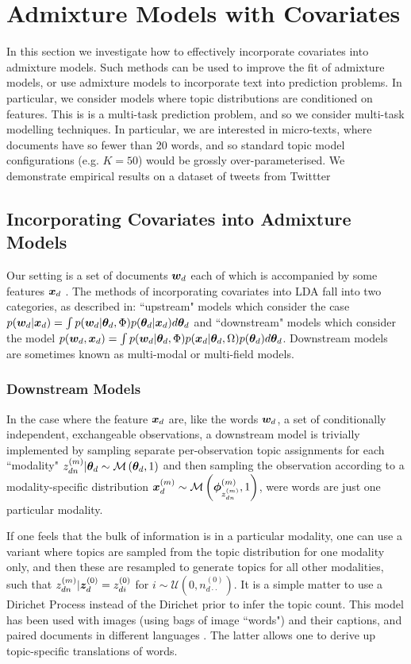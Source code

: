 
\section{Admixture Models with Covariates}
In this section we investigate how to effectively incorporate covariates into admixture models. Such methods can be used to improve the fit of admixture models, or use admixture models to incorporate text into prediction problems. In particular, we consider models where topic distributions are conditioned on features. This is is a multi-task prediction problem, and so we consider multi-task modelling techniques. In particular, we are interested in micro-texts, where documents have so fewer than 20 words, and so standard topic model configurations (e.g. $K=50$) would be grossly over-parameterised. We demonstrate empirical results on a dataset of tweets from Twittter

\subsection{Incorporating Covariates into Admixture Models}
Our setting is a set of documents $\bm w_d$ each of which is accompanied by some features $\bm x_d$ . The methods of incorporating covariates into LDA fall into two categories, as described in\cite{Mimno2008}: ``upstream" models which consider the case $p({ \bm w_d } | { \bm x_d }) = \int p({ \bm w_d }|{ \bm \theta_d }, \Phi)p({ \bm \theta_d }|{ \bm x_d }) d{ \bm \theta_d }$ 
and ``downstream" models which consider the model $p({ \bm w_d }, { \bm x_d }) = \int p({ \bm w_d }|{ \bm \theta_d }, \Phi)p({ \bm x_d }|{ \bm \theta_d }, \Omega)p({ \bm \theta_d })d{ \bm \theta_d }$. Downstream models are sometimes known as multi-modal\cite{Virtanen2012a} or multi-field\cite{Salomatin2009} models.

\subsubsection{Downstream Models}
In the case where the feature ${ \bm x_d }$ are, like the words ${ \bm w_d }$, a set of conditionally independent, exchangeable observations, a downstream model is trivially implemented\cite{Erosheva2004}\cite{Blei2003} by sampling separate per-observation topic assignments for each ``modality" $z_{dn}^{(m)}|{ \bm \theta_d } \sim \mathcal{M} \left( {{ \bm \theta_d }},{1} \right)$ and then sampling the observation according to a modality-specific distribution $\bm x_d^{(m)} \sim \mathcal{M} \left( {\bm \phi^{(m)}_{z^{(m)}_{dn}}},{1} \right)$, were words are just one particular modality.

If one feels that the bulk of information is in a particular modality, one can use a variant\cite{Blei2003} where topics are sampled from the topic distribution for one modality only, and then these are resampled to generate topics for all other modalities, such that $z_{dn}^{(m)}|\bm z_d^{(0)} = z_{di}^{(0)}$ for $i \sim \mathcal{U}(0, n_{d\cdot\cdot}^{(0)})$. It is a simple matter to use a Dirichet Process instead of the Dirichet prior to infer the topic count\cite{Yakhnenko2009}. This model has been used with images (using bags of image ``words") and their captions\cite{Blei2003}, and paired documents in different languages \cite{Zhao2001}. The latter allows one to derive up topic-specific translations of words.

